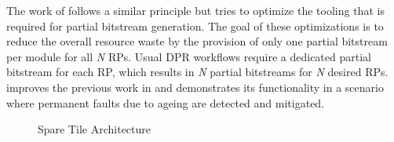 The work of \cite{martins_tmr_2015} follows a similar principle but tries to optimize the tooling that is required for partial bitstream generation.
The goal of these optimizations is to reduce the overall resource waste by the provision of only one partial bitstream per module for all \textit{N} \glspl{RP}. %
Usual \gls{DPR} workflows require a dedicated partial bitstream for each \gls{RP}, which results in \textit{N} partial bitstreams for \textit{N} desired \glspl{RP}.
\cite{martins_dynamic_2018} improves the previous work in \cite{martins_tmr_2015} and demonstrates its functionality in a scenario where permanent faults due to ageing are detected and mitigated.
\begin{center}
\begin{figure}[h]
    \centering
    \resizebox{\columnwidth}{!} {
        
    }
\caption{Spare Tile Architecture}
\label{fig:SpareTileArchitecture}
\end{figure}
\end{center}
